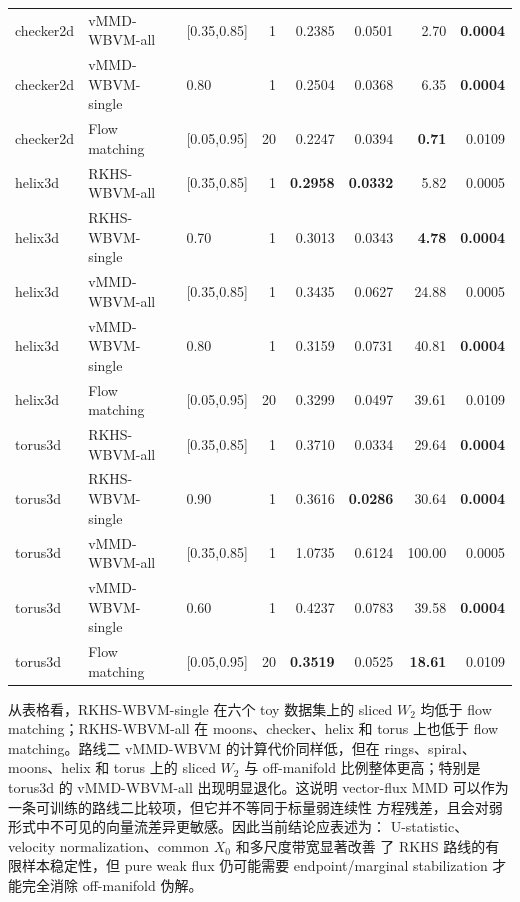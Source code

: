 \documentclass[UTF8,11pt]{ctexart}
\begin{document}
\begin{table}[htbp]
{\begin{tabular}{lllrrrrr}
checker2d & vMMD-WBVM-all & [0.35,0.85] & 1 & 0.2385 & 0.0501 & 2.70 & \textbf{0.0004} \\
checker2d & vMMD-WBVM-single & 0.80 & 1 & 0.2504 & 0.0368 & 6.35 & \textbf{0.0004} \\
checker2d & Flow matching & [0.05,0.95] & 20 & 0.2247 & 0.0394 & \textbf{0.71} & 0.0109 \\
helix3d & RKHS-WBVM-all & [0.35,0.85] & 1 & \textbf{0.2958} & \textbf{0.0332} & 5.82 & 0.0005 \\
helix3d & RKHS-WBVM-single & 0.70 & 1 & 0.3013 & 0.0343 & \textbf{4.78} & \textbf{0.0004} \\
helix3d & vMMD-WBVM-all & [0.35,0.85] & 1 & 0.3435 & 0.0627 & 24.88 & 0.0005 \\
helix3d & vMMD-WBVM-single & 0.80 & 1 & 0.3159 & 0.0731 & 40.81 & \textbf{0.0004} \\
helix3d & Flow matching & [0.05,0.95] & 20 & 0.3299 & 0.0497 & 39.61 & 0.0109 \\
torus3d & RKHS-WBVM-all & [0.35,0.85] & 1 & 0.3710 & 0.0334 & 29.64 & \textbf{0.0004} \\
torus3d & RKHS-WBVM-single & 0.90 & 1 & 0.3616 & \textbf{0.0286} & 30.64 & \textbf{0.0004} \\
torus3d & vMMD-WBVM-all & [0.35,0.85] & 1 & 1.0735 & 0.6124 & 100.00 & 0.0005 \\
torus3d & vMMD-WBVM-single & 0.60 & 1 & 0.4237 & 0.0783 & 39.58 & \textbf{0.0004} \\
torus3d & Flow matching & [0.05,0.95] & 20 & \textbf{0.3519} & 0.0525 & \textbf{18.61} & 0.0109 \\
\bottomrule
\end{tabular}
}
\end{table}

\clearpage

从表格看，RKHS-WBVM-single 在六个 toy 数据集上的 sliced \(W_2\)
均低于 flow matching；RKHS-WBVM-all 在 moons、checker、helix 和 torus
上也低于 flow matching。路线二 vMMD-WBVM 的计算代价同样低，但在
rings、spiral、moons、helix 和 torus 上的 sliced \(W_2\) 与 off-manifold
比例整体更高；特别是 torus3d 的 vMMD-WBVM-all 出现明显退化。这说明
vector-flux MMD 可以作为一条可训练的路线二比较项，但它并不等同于标量弱连续性
方程残差，且会对弱形式中不可见的向量流差异更敏感。因此当前结论应表述为：
U-statistic、velocity normalization、common \(X_0\) 和多尺度带宽显著改善
了 RKHS 路线的有限样本稳定性，但 pure weak flux 仍可能需要
endpoint/marginal stabilization 才能完全消除 off-manifold 伪解。
\end{document}
